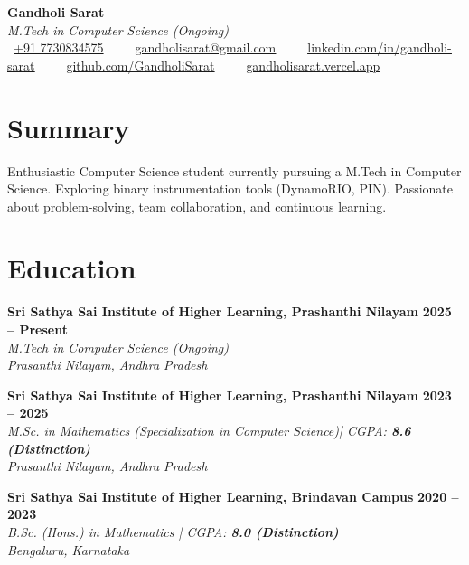 \documentclass[a4paper,10pt]{article}
\begin{document}
    \begin{center}
    {\LARGE \textbf{Gandholi Sarat}}\\
    \vspace{2pt}
    \textit{M.Tech in Computer Science (Ongoing)} \\
    \vspace{6pt}
    \faPhone~\underline{+91 7730834575}   ~ ~
    \faEnvelope~\href{mailto:gandholisarat@gmail.com}{\underline{gandholisarat@gmail.com}} ~ ~
    \faLinkedin~\href{https://www.linkedin.com/in/gandholi-sarat}{\underline{linkedin.com/in/gandholi-sarat}} ~ ~
    \faGithub~\href{https://github.com/GandholiSarat}{\underline{github.com/GandholiSarat}} ~ ~
    \faLink~\href{https://gandholisarat.vercel.app}{\underline{gandholisarat.vercel.app}}
\end{center}


\vspace{4pt}

\section*{Summary}
Enthusiastic Computer Science student currently pursuing a M.Tech in Computer Science. Exploring binary instrumentation tools (DynamoRIO, PIN). Passionate about problem-solving, team collaboration, and continuous learning.

\section*{Education}

\noindent
\textbf{Sri Sathya Sai Institute of Higher Learning, Prashanthi Nilayam} \hfill \textbf{2025 -- Present} \\
\textit{M.Tech in Computer Science (Ongoing)} \\
\textit{Prasanthi Nilayam, Andhra Pradesh}
\vspace{4pt}

\noindent
\textbf{Sri Sathya Sai Institute of Higher Learning, Prashanthi Nilayam} \hfill \textbf{2023 -- 2025} \\
\textit{M.Sc. in Mathematics (Specialization in Computer Science)| CGPA: \textbf{8.6 (Distinction)}} \\
\textit{Prasanthi Nilayam, Andhra Pradesh} 
\vspace{4pt}

\noindent
\textbf{Sri Sathya Sai Institute of Higher Learning, Brindavan Campus} \hfill \textbf{2020 -- 2023} \\
\textit{B.Sc. (Hons.) in Mathematics | CGPA: \textbf{8.0 (Distinction)}} \\
\textit{Bengaluru, Karnataka} \\[6pt]
\end{document}
